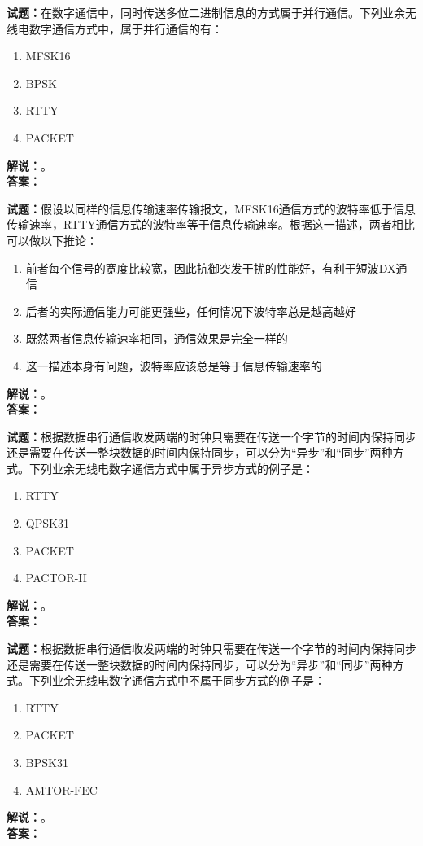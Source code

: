 \documentclass{ctexbook}
\begin{document}
\bigskip

\noindent\textbf{试题：}在数字通信中，同时传送多位二进制信息的方式属于并行通信。下列业余无线电数字通信方式中，属于并行通信的有：
\begin{enumerate}[leftmargin=3em]
  \item MFSK16
  \item BPSK
  \item RTTY
  \item PACKET
\end{enumerate}
\noindent\textbf{解说：}\textbf{}。\\\noindent\textbf{答案：}

\bigskip

\noindent\textbf{试题：}假设以同样的信息传输速率传输报文，MFSK16通信方式的波特率低于信息传输速率，RTTY通信方式的波特率等于信息传输速率。根据这一描述，两者相比可以做以下推论：
\begin{enumerate}[leftmargin=3em]
  \item 前者每个信号的宽度比较宽，因此抗御突发干扰的性能好，有利于短波DX通信
  \item 后者的实际通信能力可能更强些，任何情况下波特率总是越高越好
  \item 既然两者信息传输速率相同，通信效果是完全一样的
  \item 这一描述本身有问题，波特率应该总是等于信息传输速率的
\end{enumerate}
\noindent\textbf{解说：}\textbf{}。\\\noindent\textbf{答案：}

\bigskip

\noindent\textbf{试题：}根据数据串行通信收发两端的时钟只需要在传送一个字节的时间内保持同步还是需要在传送一整块数据的时间内保持同步，可以分为“异步”和“同步”两种方式。下列业余无线电数字通信方式中属于异步方式的例子是：
\begin{enumerate}[leftmargin=3em]
  \item RTTY
  \item QPSK31
  \item PACKET
  \item PACTOR-II
\end{enumerate}
\noindent\textbf{解说：}\textbf{}。\\\noindent\textbf{答案：}

\bigskip

\noindent\textbf{试题：}根据数据串行通信收发两端的时钟只需要在传送一个字节的时间内保持同步还是需要在传送一整块数据的时间内保持同步，可以分为“异步”和“同步”两种方式。下列业余无线电数字通信方式中不属于同步方式的例子是：
\begin{enumerate}[leftmargin=3em]
  \item RTTY
  \item PACKET
  \item BPSK31
  \item AMTOR-FEC
\end{enumerate}
\noindent\textbf{解说：}\textbf{}。\\\noindent\textbf{答案：}
\end{document}
